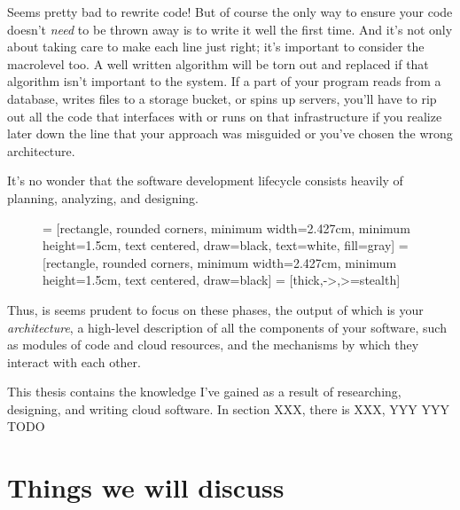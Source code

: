 \documentclass{article}
\newcommand{\noterm}[1]{\textit{#1}}
\newcommand{\term}[1]{\noterm{#1}\index{#1}}
\begin{document}
Seems pretty bad to rewrite code!
But of course the only way to ensure your code doesn't \textit{need} to be thrown away is to write it well the first time.
And it's not only about taking care to make each line just right; it's important to consider the macrolevel too.
A well written algorithm will be torn out and replaced if that algorithm isn't important to the system.
If a part of your program reads from a database, writes files to a storage bucket, or spins up servers, you'll have to rip out all the code that interfaces with or runs on that infrastructure if you realize later down the line that your approach was misguided or you've chosen the wrong architecture.

It's no wonder that the software development lifecycle consists heavily of planning, analyzing, and designing.

\begin{figure}[h]
  \centering
   = [rectangle, rounded corners, minimum width=2.427cm, minimum height=1.5cm, text centered, draw=black, text=white, fill=gray]
   = [rectangle, rounded corners, minimum width=2.427cm, minimum height=1.5cm, text centered, draw=black]
   = [thick,->,>=stealth]
  \label{fig:sdl}
\end{figure}

Thus, is seems prudent to focus on these phases, the output of which is your \term{architecture}, a high-level description of all the components of your software, such as modules of code and cloud resources, and the mechanisms by which they interact with each other.

This thesis contains the knowledge I've gained as a result of researching, designing, and writing cloud software.
In section XXX, there is XXX, YYY YYY TODO

\section{Things we will discuss}
\end{document}
